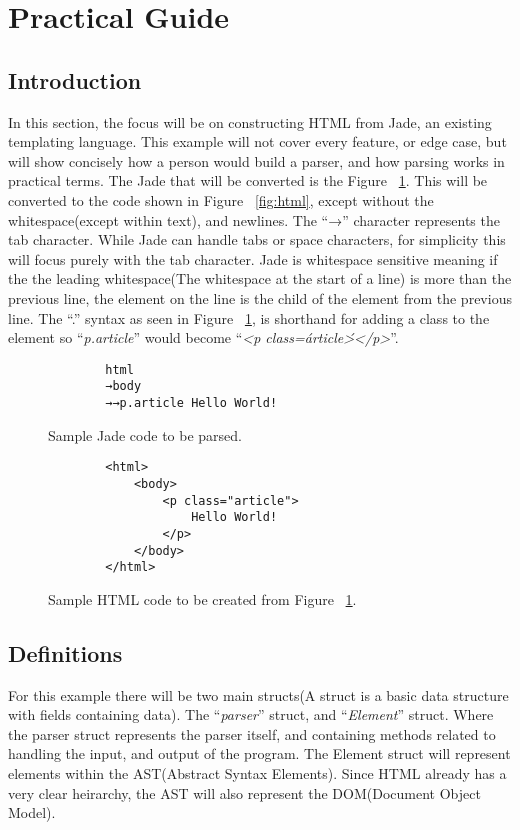 \section{Practical Guide}

\subsection{Introduction}
In this section, the focus will be on constructing HTML from Jade, an existing templating language. This example will not cover every feature, or edge case, but will show concisely how a person would build a parser, and how parsing works in practical terms. The Jade that will be converted is the Figure	~\ref{fig:jade}. This will be converted to the code shown in Figure ~\ref{fig:html}, except without the whitespace(except within text), and newlines. The ``→'' character represents the tab character. While Jade can handle tabs or space characters, for simplicity this will focus purely with the tab character. Jade is whitespace sensitive meaning if the the leading whitespace(The whitespace at the start of a line) is more than the previous line, the element on the line is the child of the element from the previous line. The ``.'' syntax as seen in Figure ~\ref{fig:jade}, is shorthand for adding a class to the element so ``\textit{p.article}'' would become ``\textit{<p class=\'article\'></p>}''.

\begin{figure}
	\begin{verbatim}
		html
		→body
		→→p.article Hello World!
	\end{verbatim}
	\caption{Sample Jade code to be parsed.}
	\label{fig:jade}
\end{figure}

\begin{figure}
	\begin{verbatim}
		<html>
			<body>
				<p class="article">
					Hello World!
				</p>
			</body>
		</html>
	\end{verbatim}
	\caption{Sample HTML code to be created from Figure ~\ref{fig:jade}.}
\end{figure}

\subsection{Definitions}
For this example there will be two main structs(A struct is a basic data structure with fields containing data). The ``\textit{parser}'' struct, and ``\textit{Element}'' struct. Where the parser struct represents the parser itself, and containing methods related to handling the input, and output of the program. The Element struct will represent elements within the AST(Abstract Syntax Elements). Since HTML already has a very clear heirarchy, the AST will also represent the DOM(Document Object Model).


